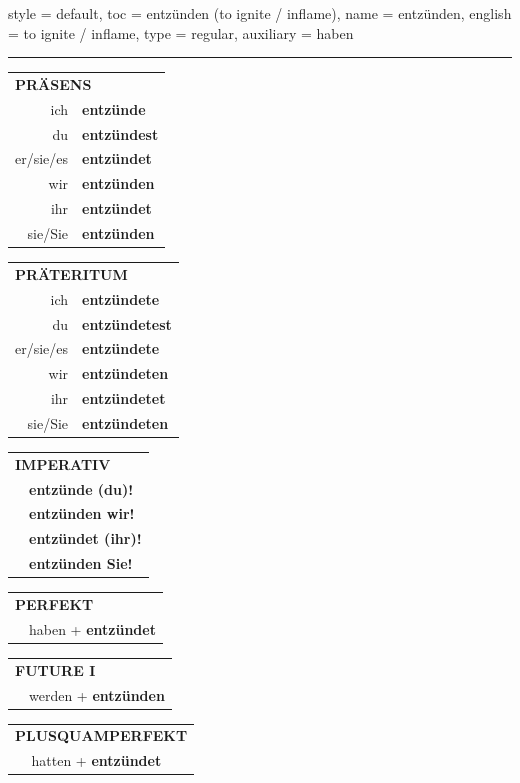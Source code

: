 \begin{verbentry}{
  style = {default},
  toc = {entzünden (to ignite / inflame)},
  name = {entzünden},
  english = {to ignite / inflame},
  type = {regular},
  auxiliary = {haben}
}


\vspace{5pt}
\hrule
\vspace{5pt}

\begin{tabular}{rl}
\multicolumn{2}{l}{\textbf{PRÄSENS}}\\
ich & \textbf{entzünde}\\
du & \textbf{entzündest}\\
er/sie/es & \textbf{entzündet}\\
wir & \textbf{entzünden}\\
ihr & \textbf{entzündet}\\
sie/Sie & \textbf{entzünden}\\
\end{tabular}
\hfill
\begin{tabular}{rl}
\multicolumn{2}{l}{\textbf{PRÄTERITUM}}\\
ich & \textbf{entzündete}\\
du & \textbf{entzündetest}\\
er/sie/es & \textbf{entzündete}\\
wir & \textbf{entzündeten}\\
ihr & \textbf{entzündetet}\\
sie/Sie & \textbf{entzündeten}\\
\end{tabular}
\hfill
\begin{tabular}{rl}
\multicolumn{2}{l}{\textbf{IMPERATIV}}\\
& \textbf{entzünde (du)!}\\
& \textbf{entzünden wir!}\\
& \textbf{entzündet (ihr)!}\\
& \textbf{entzünden Sie!}\\
\end{tabular}

\vspace{10pt}

\begin{tabular}{rl}
\multicolumn{2}{l}{\textbf{PERFEKT}}\\
& haben + \textbf{entzündet}\\
\end{tabular}
\hfill
\begin{tabular}{rl}
\multicolumn{2}{l}{\textbf{FUTURE I}}\\
& werden + \textbf{entzünden}\\
\end{tabular}
\hfill
\begin{tabular}{rl}
\multicolumn{2}{l}{\textbf{PLUSQUAMPERFEKT}}\\
& hatten + \textbf{entzündet}\\
\end{tabular}


\end{verbentry}
